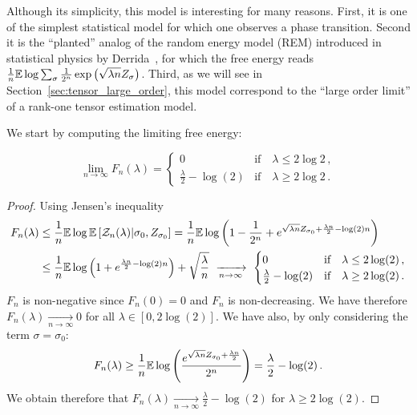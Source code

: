 \documentclass[12pt,nocut]{article}
\begin{document}
Although its simplicity, this model is interesting for many reasons. 
First, it is one of the simplest statistical model for which one observes a phase transition.
Second it is the ``planted'' analog of the random energy model (REM) introduced in statistical physics by Derrida~\cite{derrida1980random,derrida1981random}, for which the free energy reads $\frac{1}{n} \mathbb{E} \log \sum_{\sigma}\frac{1}{2^n} \exp\big(\sqrt{\lambda n} Z_{\sigma}\big)$. Third, as we will see in Section~\ref{sec:tensor_large_order}, this model correspond to the ``large order limit'' of a rank-one tensor estimation model. 

We start by computing the limiting free energy:

\begin{theorem}
$$
\lim_{n\to \infty} F_n(\lambda) = 
\begin{cases}
	0 & \text{if} \quad \lambda \leq 2 \log 2 \,, \\
	\frac{\lambda}{2} - \log(2)& \text{if} \quad \lambda \geq 2 \log 2 \,.
\end{cases}
$$
\end{theorem}
\begin{proof}
	Using Jensen's inequality
	\begin{align*}
	F_n(\lambda) 
	&\leq \frac{1}{n} \mathbb{E} \log \mathbb{E} \left[ \mathcal{Z}_n(\lambda) \middle| \sigma_0, Z_{\sigma_0} \right]
	= \frac{1}{n} \mathbb{E} \log \left(1 - \frac{1}{2^n} + e^{\sqrt{\lambda n} Z_{\sigma_0} + \frac{\lambda n}{2} - \log(2)n}\right)
	\\
	&\leq \frac{1}{n} \mathbb{E} \log \left(1 + e^{\frac{\lambda n}{2} - \log(2)n}\right) + \sqrt{\frac{\lambda}{n}}
	\ \xrightarrow[n \to \infty]{}  \
	\begin{cases}
		0 & \text{if} \quad \lambda \leq 2 \log(2)\,, \\
		\frac{\lambda}{2} - \log(2) & \text{if} \quad \lambda \geq 2 \log(2) \,.
	\end{cases}
	\end{align*}
	$F_n$ is non-negative since $F_n(0) = 0$ and $F_n$ is non-decreasing. We have therefore $F_n(\lambda) \xrightarrow[n \to \infty]{} 0$ for all $\lambda \in [0,2\log(2)]$.
	We have also, by only considering the term $\sigma = \sigma_0$:
	$$
	F_n(\lambda) \geq \frac{1}{n} \mathbb{E} \log \left(\frac{e^{\sqrt{\lambda n}Z_{\sigma_0} + \frac{\lambda n}{2}}}{2^n}\right) = \frac{\lambda}{2} - \log(2) \,.
	$$
	We obtain therefore that $F_n(\lambda ) \xrightarrow[n \to \infty]{} \frac{\lambda}{2} - \log(2)$ for $\lambda \geq 2 \log(2)$.
\end{proof}
\\
\end{document}

